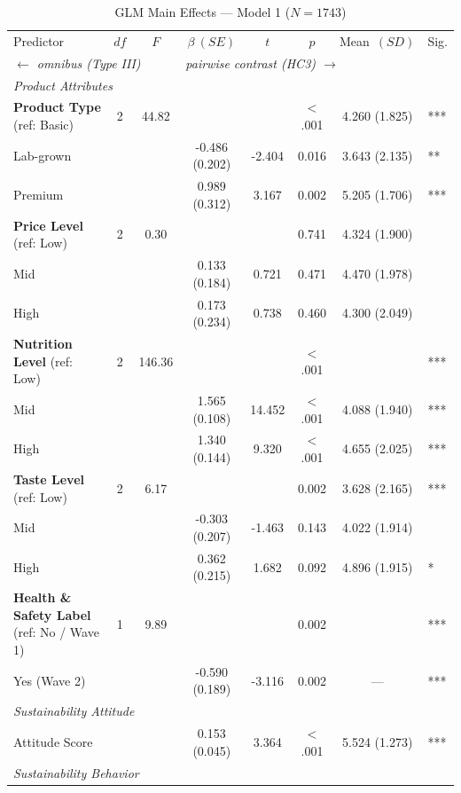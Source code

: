 \begin{table}[ht]
\centering
\caption{GLM Main Effects --- Model 1 ($N=1743$)}
\label{tab:glm_main}
\begin{threeparttable}
\begin{tabular}{lccccccl}
\toprule
Predictor & $df$ & $F$ & $\beta\ (SE)$ & $t$ & $p$ & Mean\ $(SD)$ & Sig. \\
\multicolumn{3}{l}{\scriptsize\textit{$\leftarrow$ omnibus (Type III)}} & \multicolumn{4}{l}{\scriptsize\textit{pairwise contrast (HC3) $\rightarrow$}} & \\
\midrule
\multicolumn{8}{l}{\textit{Product Attributes}} \\
\quad \textbf{Product Type} (ref: Basic) & 2 & 44.82 & & & $<$.001 & 4.260 (1.825) & *** \\
\qquad Lab-grown & & & -0.486 (0.202) & -2.404 & 0.016 & 3.643 (2.135) & ** \\
\qquad Premium & & & 0.989 (0.312) & 3.167 & 0.002 & 5.205 (1.706) & *** \\
\quad \textbf{Price Level} (ref: Low) & 2 & 0.30 & & & 0.741 & 4.324 (1.900) &  \\
\qquad Mid & & & 0.133 (0.184) & 0.721 & 0.471 & 4.470 (1.978) &  \\
\qquad High & & & 0.173 (0.234) & 0.738 & 0.460 & 4.300 (2.049) &  \\
\quad \textbf{Nutrition Level} (ref: Low) & 2 & 146.36 & & & $<$.001 &  & *** \\
\qquad Mid & & & 1.565 (0.108) & 14.452 & $<$.001 & 4.088 (1.940) & *** \\
\qquad High & & & 1.340 (0.144) & 9.320 & $<$.001 & 4.655 (2.025) & *** \\
\quad \textbf{Taste Level} (ref: Low) & 2 & 6.17 & & & 0.002 & 3.628 (2.165) & *** \\
\qquad Mid & & & -0.303 (0.207) & -1.463 & 0.143 & 4.022 (1.914) &  \\
\qquad High & & & 0.362 (0.215) & 1.682 & 0.092 & 4.896 (1.915) & * \\
\quad \textbf{Health \& Safety Label} (ref: No / Wave 1) & 1 & 9.89 & & & 0.002 &  & *** \\
\qquad Yes (Wave 2) & & & -0.590 (0.189) & -3.116 & 0.002 & --- & *** \\
\multicolumn{8}{l}{\textit{Sustainability Attitude}} \\
\quad Attitude Score & & & 0.153 (0.045) & 3.364 & $<$.001 & 5.524 (1.273) & *** \\
\multicolumn{8}{l}{\textit{Sustainability Behavior}} \\

\end{tabular}
\end{threeparttable}
\end{table}
